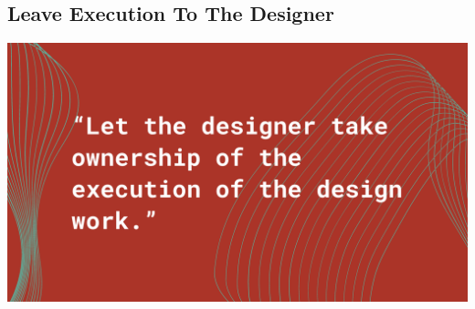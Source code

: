 \documentclass[
]{book}
\begin{document}
\hypertarget{leave-execution-to-the-designer}{%
\subsection{Leave Execution To The Designer}\label{leave-execution-to-the-designer}}

\includegraphics{images/Working-With-Graphic-Designers-Quote-4.png}
\end{document}
